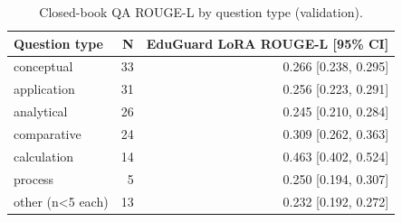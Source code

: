 \begin{table}[t]
\centering
\caption{Closed-book QA ROUGE-L by question type (validation).}
\label{tab:t6_qa_by_type}
\begin{tabular}{lrr}
\toprule
Question type & N & EduGuard LoRA ROUGE-L [95\% CI] \\
\midrule
conceptual & 33 & 0.266 [0.238, 0.295] \\
application & 31 & 0.256 [0.223, 0.291] \\
analytical & 26 & 0.245 [0.210, 0.284] \\
comparative & 24 & 0.309 [0.262, 0.363] \\
calculation & 14 & 0.463 [0.402, 0.524] \\
process & 5 & 0.250 [0.194, 0.307] \\
other (n<5 each) & 13 & 0.232 [0.192, 0.272] \\
\bottomrule
\end{tabular}
\end{table}
